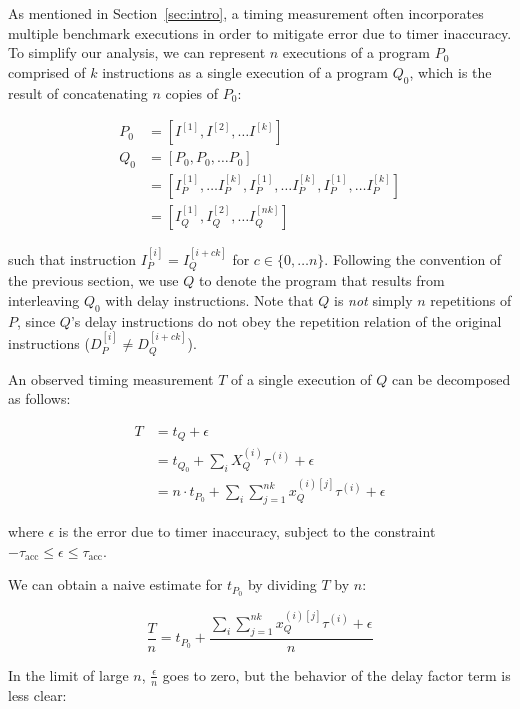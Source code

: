 \documentclass[conference]{IEEEtran}
\begin{document}
As mentioned in Section~\ref{sec:intro}, a timing measurement often incorporates
multiple benchmark executions in order to mitigate error due to timer inaccuracy. To
simplify our analysis, we can represent $n$ executions of a program $P_0$ comprised of $k$
instructions as a single execution of a program $Q_0$, which is the result of concatenating
$n$ copies of $P_0$:

\begin{align}
P_0 &= \left[I^{[1]}, I^{[2]}, \dots I^{[k]} \right] \\ \nonumber
Q_0 &= \left[P_0, P_0, \dots P_0 \right] \\ \nonumber
    &= \left[I_{P}^{[1]}, \dots I_{P}^{[k]}, I_{P}^{[1]}, \dots I_{P}^{[k]}, I_{P}^{[1]}, \dots I_{P}^{[k]} \right] \\ \nonumber
    &= \left[I_{Q}^{[1]}, I_{Q}^{[2]}, \dots I_{Q}^{[nk]} \right]
\end{align}

such that instruction $I_{P}^{[i]} = I_{Q}^{[i + ck]}$ for $c \in \{0, \dots n\}$. Following
the convention of the previous section, we use $Q$ to denote the program that results from
interleaving $Q_0$ with delay instructions. Note that $Q$ is \textit{not} simply $n$
repetitions of $P$, since $Q$'s delay instructions do not obey the repetition relation
of the original instructions ($D_{P}^{[i]} \ne D_{Q}^{[i + ck]}$).

An observed timing measurement $T$ of a single execution of $Q$ can be decomposed as
follows:

\begin{align}
    T &= t_{Q} + \epsilon \\ \nonumber
      &= t_{Q_0} + \sum_{i} X_Q^{(i)} \tau^{(i)} + \epsilon \\ \nonumber
      &= n \cdot t_{P_0} + \sum_{i} \sum_{j=1}^{nk} x_Q^{(i)[j]} \tau^{(i)} + \epsilon
\end{align}

where $\epsilon$ is the error due to timer inaccuracy, subject to the
constraint $-\tau_{\textrm{acc}} \le \epsilon \le \tau_{\textrm{acc}}$.

We can obtain a naive estimate for $t_{P_0}$ by dividing $T$ by $n$:

\begin{equation}
    \frac{T}{n} = t_{P_0} + \frac{\sum_{i} \sum_{j=1}^{nk} x_Q^{(i)[j]} \tau^{(i)} + \epsilon}{n}
\end{equation}

In the limit of large $n$, $\frac{\epsilon}{n}$ goes to zero, but the behavior of the delay
factor term is less clear:
\end{document}
